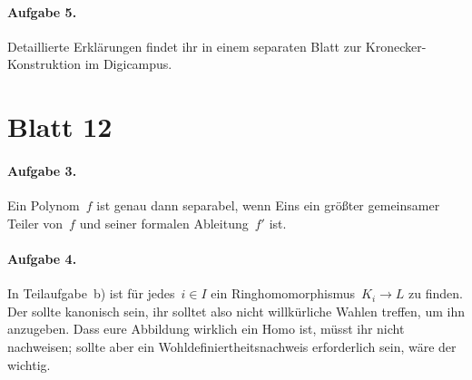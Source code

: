 \documentclass{algblatt}
\newcommand{\hint}[1]{\rotatebox{180}{\vbox{\textcolor{grey}{#1}}}}
\begin{document}
\paragraph{Aufgabe 5.} Detaillierte Erklärungen findet ihr in einem separaten
Blatt zur Kronecker-Konstruktion im Digicampus.


\section*{Blatt 12}

\paragraph{Aufgabe 3.} Ein Polynom~$f$ ist genau dann separabel, wenn Eins ein
größter gemeinsamer Teiler von~$f$ und seiner formalen Ableitung~$f'$ ist.

\hint{In Algebra~I wurde bewiesen, dass jedes irreduzible Polynom über~$\QQ$
schon separabel ist. Den damaligen Beweis kann man in Teilaufgabe~a)
imitieren.}

\paragraph{Aufgabe 4.} In Teilaufgabe~b) ist für jedes~$i \in I$ ein
Ringhomomorphismus~$K_i \to L$ zu finden. Der sollte kanonisch sein, ihr
solltet also nicht willkürliche Wahlen treffen, um ihn anzugeben. Dass eure
Abbildung wirklich ein Homo ist, müsst ihr nicht nachweisen; sollte aber ein
Wohldefiniertheitsnachweis erforderlich sein, wäre der wichtig.
\end{document}

